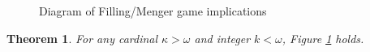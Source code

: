 \documentclass{amsart}
\newtheorem{theorem}{Theorem}[section]
\theoremstyle{definition}
\begin{document}
\begin{figure}[h]
\begin{center}


\end{center}
\caption{Diagram of Filling/Menger game implications}
\label{fillingGamesDiagram}
\end{figure}

\begin{theorem}
For any cardinal \(\kappa>\omega\) and integer \(k<\omega\),
Figure \ref{fillingGamesDiagram} holds.
\end{theorem}
\end{document}
